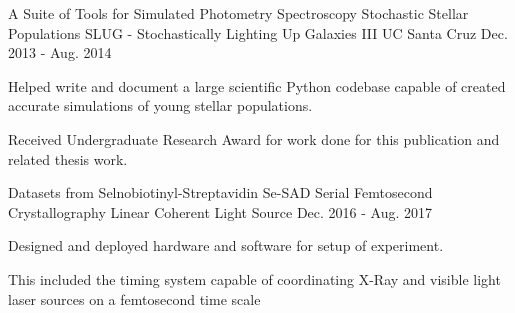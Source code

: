 \begin{cventries}
  \cventry
    {A Suite of Tools for Simulated Photometry Spectroscopy Stochastic Stellar Populations}
    {SLUG - Stochastically Lighting Up Galaxies III}
    {UC Santa Cruz}
    {Dec. 2013 - Aug. 2014}
    {
      \begin{cvitems}
        \item {Helped write and document a large scientific Python codebase capable of created accurate simulations of young stellar populations.}
        \item {Received Undergraduate Research Award for work done for this publication and related thesis work.}
      \end{cvitems}
    }
  \cventry
    {Datasets from Selnobiotinyl-Streptavidin}
    {Se-SAD Serial Femtosecond Crystallography}
    {Linear Coherent Light Source}
    {Dec. 2016 - Aug. 2017}
    {
      \begin{cvitems}
        \item {Designed and deployed hardware and software for setup of
               experiment.}
        \item {This included the timing system capable of coordinating
               X-Ray and visible light laser sources on a femtosecond time scale}
      \end{cvitems}
    }
\end{cventries}

